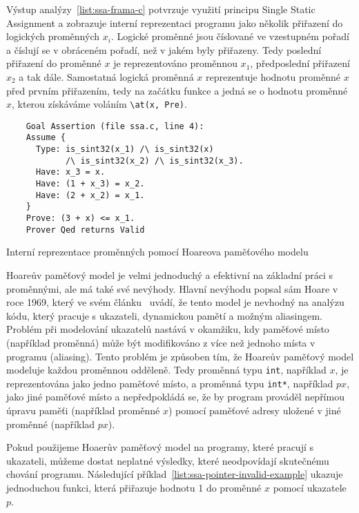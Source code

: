Výstup analýzy~\ref{list:ssa-frama-c} potvrzuje využití principu Single Static Assignment
a zobrazuje interní reprezentaci programu jako několik přiřazení do logických proměnných $x_i$.
Logické proměnné jsou číslované ve vzestupném pořadí a číslují se v obráceném pořadí, než v jakém byly přiřazeny.
Tedy poslední přiřazení do proměnné $x$ je reprezentováno proměnnou $x_1$, předposlední přiřazení $x_2$ a tak dále.
Samostatná logická proměnná $x$ reprezentuje hodnotu proměnné $x$ před prvním přiřazením,
tedy na začátku funkce a jedná se o hodnotu proměnné $x$, kterou získáváme voláním \texttt{\textbackslash at(x, Pre)}.

\begin{listing}[H]
    \begin{verbatim}
    Goal Assertion (file ssa.c, line 4):
    Assume {
      Type: is_sint32(x_1) /\ is_sint32(x)
            /\ is_sint32(x_2) /\ is_sint32(x_3).
      Have: x_3 = x.
      Have: (1 + x_3) = x_2.
      Have: (2 + x_2) = x_1.
    }
    Prove: (3 + x) <= x_1.
    Prover Qed returns Valid
    \end{verbatim}
    \caption{Interní reprezentace proměnných pomocí Hoareova paměťového modelu}
    \label{list:ssa-frama-c}
\end{listing}


Hoareův paměťový model je velmi jednoduchý a efektivní na základní práci s proměnnými, ale má také své nevýhody.
Hlavní nevýhodu popsal sám Hoare v roce 1969, který ve svém článku~\cite{Hoare1969} uvádí,
že tento model je nevhodný na analýzu kódu, který pracuje s ukazateli, dynamickou pamětí a možným aliasingem.
Problém při modelování ukazatelů nastává v okamžiku,
kdy paměťové místo (například proměnná) může být modifikováno z více než jednoho místa v programu (aliasing).
Tento problém je způsoben tím, že Hoareův paměťový model modeluje každou proměnnou odděleně.
Tedy proměnná typu \texttt{int}, například $x$, je reprezentována jako jedno paměťové místo,
a proměnná typu \texttt{int*}, například $px$, jako jiné paměťové místo a nepředpokládá se,
že by program prováděl nepřímou úpravu paměťi (například proměnné $x$) pomocí paměťové adresy
uložené v jiné proměnné (například $px$).

Pokud použijeme Hoaerův paměťový model na programy, které pracují s ukazateli,
můžeme dostat neplatné výsledky, které neodpovídají skutečnému chování programu.
Následující příklad~\ref{list:ssa-pointer-invalid-example} ukazuje jednoduchou funkci,
která přiřazuje hodnotu 1 do proměnné $x$ pomocí ukazatele $p$.

